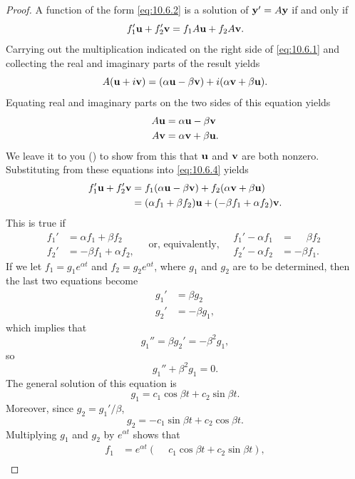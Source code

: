 \begin{proof}
A function of the form \eqref{eq:10.6.2} is a solution of $\mathbf{y}'=A\mathbf{y}$ if and only if
\begin{equation} \label{eq:10.6.4}
f_1'\mathbf{u}+f_2'\mathbf{v}=f_1A\mathbf{u}+f_2A\mathbf{v}.
\end{equation}
Carrying out the multiplication indicated on the  right side
of \eqref{eq:10.6.1} and collecting the  real and imaginary parts of the
result yields
\[
A(\mathbf{u}+i\mathbf{v})=(\alpha\mathbf{u}-\beta\mathbf{v})+i(\alpha\mathbf{v}+\beta\mathbf{u}).
\]
Equating real and imaginary parts on the two sides of this equation yields
\begin{align*}
A\mathbf{u}&=\alpha\mathbf{u}-\beta\mathbf{v}\\
A\mathbf{v}&=\alpha\mathbf{v}+\beta\mathbf{u}.
\end{align*}
We leave it to you () to show from this that
$\mathbf{u}$ and
$\mathbf{v}$ are both nonzero.
Substituting from these equations into \eqref{eq:10.6.4} yields
\begin{align*}
f_1'\mathbf{u}+f_2'\mathbf{v}
&=f_1(\alpha\mathbf{u}-\beta\mathbf{v})+f_2(\alpha\mathbf{v}+\beta\mathbf{u})\\
&=(\alpha f_1+\beta f_2)\mathbf{u}+(-\beta f_1+\alpha f_2)\mathbf{v}.
\end{align*}
This is true if
\[
\begin{aligned}
f_1'&=\alpha f_1+\beta f_2\phantom{,}\\
f_2'&=-\beta f_1+\alpha f_2,
\end{aligned}
\quad\text{or, equivalently,}\quad
\begin{aligned}
f_1'-\alpha f_1&=\phantom{-}\beta f_2\phantom{.}\\
f_2'-\alpha f_2&=-\beta f_1.
\end{aligned}
\]
If we let $f_1=g_1e^{\alpha t}$ and $f_2=g_2e^{\alpha t}$, where
$g_1$ and $g_2$ are to be determined, then the last two equations
become
\begin{align*}
g_1'&=\beta g_2\phantom{.}\\
g_2'&=-\beta g_1,
\end{align*}
which implies that
\[
g_1''=\beta g_2'=-\beta^2 g_1,
\]
so
\[
g_1''+\beta^2 g_1=0.
\]
The general solution of this equation is
\[
g_1=c_1\cos\beta t+c_2\sin\beta t.
\]
Moreover, since $g_2=g_1'/\beta$,
\[
g_2=-c_1\sin\beta t+c_2\cos\beta t.
\]
Multiplying  $g_1$  and $g_2$  by $e^{\alpha t}$ shows that
\begin{align*}
f_1&=e^{\alpha t}(\phantom{-}c_1\cos\beta t+c_2\sin\beta t ),\\

\end{align*}
\end{proof}
